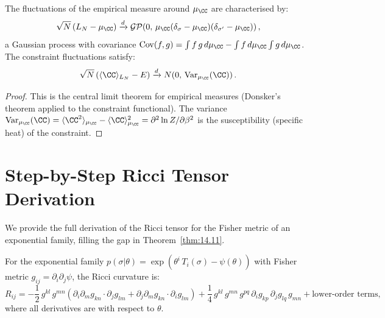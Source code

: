 \begin{theorem}\label{thm:15.8}
The fluctuations of the empirical measure around $\mu_{\CC}$ are
characterised by:
\begin{equation}\label{eq:fluctuation}
  \sqrt{N}\,(L_N - \mu_{\CC}) \xrightarrow{d}
  \mathcal{GP}\!\left(0,\,
  \mu_{\CC}(\delta_\sigma - \mu_{\CC})
  (\delta_{\sigma'} - \mu_{\CC})\right),
\end{equation}
a Gaussian process with covariance
$\mathrm{Cov}(f, g) = \int f\,g\,d\mu_{\CC}
- \int f\,d\mu_{\CC}\int g\,d\mu_{\CC}$.
The constraint fluctuations satisfy:
\begin{equation}
  \sqrt{N}\,(\langle\CC\rangle_{L_N} - E)
  \xrightarrow{d} N\!\left(0,\,
  \mathrm{Var}_{\mu_{\CC}}(\CC)\right).
\end{equation}
\end{theorem}

\begin{proof}
This is the central limit theorem for empirical measures
(Donsker's theorem applied to the constraint functional).
The variance $\mathrm{Var}_{\mu_{\CC}}(\CC) =
\langle\CC^2\rangle_{\mu_{\CC}} - \langle\CC\rangle_{\mu_{\CC}}^2
= \partial^2 \ln Z / \partial\beta^2$ is the susceptibility
(specific heat) of the constraint.
\end{proof}

\section{Step-by-Step Ricci Tensor Derivation}
\label{sec:ch15:ricci}

We provide the full derivation of the Ricci tensor for the Fisher
metric of an exponential family, filling the gap in
Theorem~\ref{thm:14.11}.

\begin{theorem}\label{thm:15.8b}
For the exponential family $p(\sigma|\theta) =
\exp(\theta^i\,T_i(\sigma) - \psi(\theta))$ with Fisher metric
$g_{ij} = \partial_i \partial_j \psi$, the Ricci curvature is:
\begin{equation}\label{eq:ricci-fisher}
  R_{ij} = -\frac{1}{2}\,g^{kl}\,g^{mn}\left(
    \partial_i \partial_m g_{kn} \cdot \partial_j g_{lm}
    + \partial_j \partial_m g_{kn} \cdot \partial_i g_{lm}
  \right)
  + \frac{1}{4}\,g^{kl}\,g^{mn}\,g^{pq}\,
  \partial_i g_{kp}\,\partial_j g_{lq}\,g_{mn}
  + \text{lower-order terms},
\end{equation}
where all derivatives are with respect to $\theta$.
\end{theorem}

